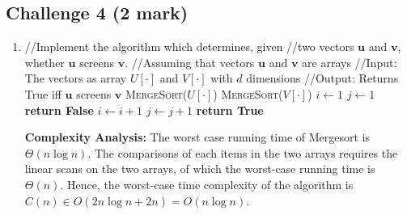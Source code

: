 \documentclass[11pt]{article}
\begin{document}
\subsection*{Challenge 4 \hfill {\small (2 mark)}}
\begin{enumerate}
\item
    \begin{algorithmic}[1]
    \State //Implement the algorithm which determines, given
    \State //two vectors $\mathbf{u}$ and $\mathbf{v}$, whether $\mathbf{u}$ screens $\mathbf{v}$.
    \State //Assuming that vectors $\mathbf{u}$ and $\mathbf{v}$ are arrays
    \State //Input: The vectors as array $U[\cdot]$ and $V[\cdot]$ with $d$ dimensions
    \State //Output: Returns True iff $\mathbf{u}$ screens $\mathbf{v}$
        \State \textsc{MergeSort}($U[\cdot]$)
        \State \textsc{MergeSort}($V[\cdot]$) 
        \State $i\gets 1$
        \State $j\gets 1$
         
                \State \textbf{return False}
                \EndIf
            \State $i\gets i+1$
            \State $j\gets j+1$
                \EndWhile
        \State \textbf{return True}
    \EndFunction
    \end{algorithmic}
    \textbf{Complexity Analysis:} The worst case running time of Mergesort is $\Theta(n\log n)$.
    The comparisons of each items in the two arrays requires the linear scans on the two arrays, of
    which the worst-case running time is $\Theta(n)$. Hence, the worst-case time complexity of the
    algorithm is $C(n)\in O(2n\log n + 2n) = O(n\log n)$.
\end{enumerate}
\end{document}
